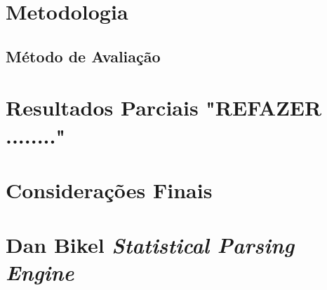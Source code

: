 \documentclass[a4paper]{abnt}
\begin{document}
\chapter{Metodologia}
\label{cha:metodologia}
	

\section{Método de Avaliação}
\label{cha:avaliacao}
	

\chapter{Resultados Parciais "REFAZER ........"}
\label{cha:resultados_parciais}
	

\chapter{Considerações Finais}
\label{cha:consuderacoes_finais}
	

\appendix

\chapter{Dan Bikel \emph{Statistical Parsing Engine}}
\label{cha:dan_bikel1}
	


%	

%

\renewcommand{\bibname}{Referência Bibliografia}

\end{document}
